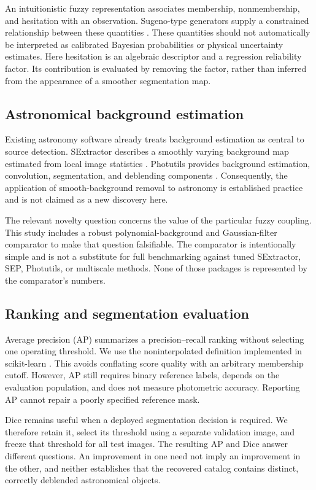 \documentclass[conference]{IEEEtran}
\begin{document}
An intuitionistic fuzzy representation associates membership, nonmembership, and hesitation with an observation. Sugeno-type generators supply a constrained relationship between these quantities \cite{zenian}. These quantities should not automatically be interpreted as calibrated Bayesian probabilities or physical uncertainty estimates. Here hesitation is an algebraic descriptor and a regression reliability factor. Its contribution is evaluated by removing the factor, rather than inferred from the appearance of a smoother segmentation map.

\subsection{Astronomical background estimation}
Existing astronomy software already treats background estimation as central to source detection. SExtractor describes a smoothly varying background map estimated from local image statistics \cite{sextractor}. Photutils provides background estimation, convolution, segmentation, and deblending components \cite{photutils}. Consequently, the application of smooth-background removal to astronomy is established practice and is not claimed as a new discovery here.

The relevant novelty question concerns the value of the particular fuzzy coupling. This study includes a robust polynomial-background and Gaussian-filter comparator to make that question falsifiable. The comparator is intentionally simple and is not a substitute for full benchmarking against tuned SExtractor, SEP, Photutils, or multiscale methods. None of those packages is represented by the comparator's numbers.

\subsection{Ranking and segmentation evaluation}
Average precision (AP) summarizes a precision--recall ranking without selecting one operating threshold. We use the noninterpolated definition implemented in scikit-learn \cite{ap}. This avoids conflating score quality with an arbitrary membership cutoff. However, AP still requires binary reference labels, depends on the evaluation population, and does not measure photometric accuracy. Reporting AP cannot repair a poorly specified reference mask.

Dice remains useful when a deployed segmentation decision is required. We therefore retain it, select its threshold using a separate validation image, and freeze that threshold for all test images. The resulting AP and Dice answer different questions. An improvement in one need not imply an improvement in the other, and neither establishes that the recovered catalog contains distinct, correctly deblended astronomical objects.
\end{document}
